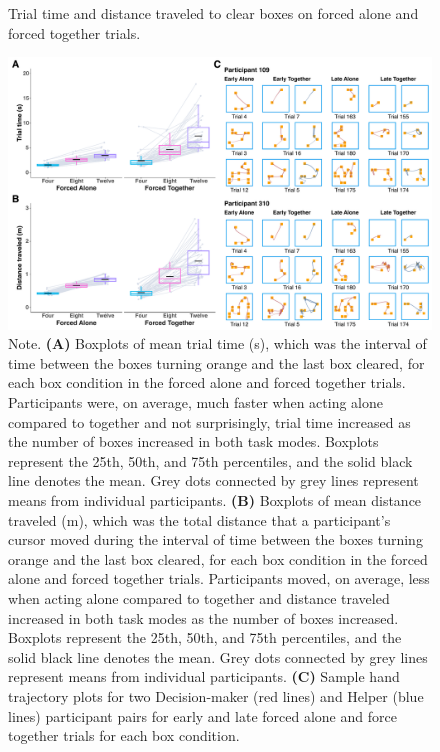 \documentclass[
  man,
  floatsintext,
  longtable,
  nolmodern,
  notxfonts,
  notimes,
  mask,
  colorlinks=true,linkcolor=blue,citecolor=blue,urlcolor=blue]{apa7}
\begin{document}
\begin{figure}[htbp]
\caption{Trial time and distance traveled to clear boxes on forced alone and forced together trials.}
\centering
\includegraphics[scale=0.5]{../../figs/fig3.pdf}
\setlength{\belowcaptionskip}{-2em}
\caption*{\singlespacing \small Note. \normalfont \textbf{(A)} Boxplots of mean trial time (s), which was the interval of time between the boxes turning orange and the last box cleared, for each box condition in the forced alone and forced together trials. Participants were, on average, much faster when acting alone compared to together and not surprisingly, trial time increased as the number of boxes increased in both task modes. Boxplots represent the 25th, 50th, and 75th percentiles, and the solid black line denotes the mean. Grey dots connected by grey lines represent means from individual participants. \textbf{(B)} Boxplots of mean distance traveled (m), which was the total distance that a participant's cursor moved during the interval of time between the boxes turning orange and the last box cleared, for each box condition in the forced alone and forced together trials. Participants moved, on average, less when acting alone compared to together and distance traveled increased in both task modes as the number of boxes increased. Boxplots represent the 25th, 50th, and 75th percentiles, and the solid black line denotes the mean. Grey dots connected by grey lines represent means from individual participants. \textbf{(C)} Sample hand trajectory plots for two Decision-maker (red lines) and Helper (blue lines) participant pairs for early and late forced alone and force together trials for each box condition.
}
\label{fig:fig3}
\end{figure}
\end{document}
